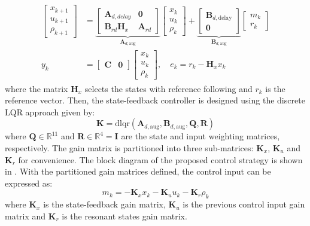 \begin{align}
    \begin{aligned}
        \begin{bmatrix}
            x_{k + 1}\\
            u_{k + 1}\\
            \rho_{k + 1}
        \end{bmatrix}
        &=
        \underbrace{
        \begin{bmatrix}
            \mathbf{A}_{d,delay} & \mathbf{0} \\
            \mathbf{B}_{rd}\mathbf{H}_x & \mathbf{A}_{rd}
        \end{bmatrix}
        }_{\mathbf{A}_{d,\text{aug}}}
        \begin{bmatrix}
            x_k\\
            u_k\\
            \rho_k
        \end{bmatrix}
        +
        \underbrace{
        \begin{bmatrix}
            \mathbf{B}_{d,\text{delay}}\\
            \mathbf{0}
        \end{bmatrix}
        }_{\mathbf{B}_{d,\text{aug}}}
        \begin{bmatrix}
            m_k\\
            r_k
        \end{bmatrix}
        \\
        y_k &= 
        \begin{bmatrix}
            \mathbf{C} & \mathbf{0}
        \end{bmatrix}
        \begin{bmatrix}
            x_k\\
            u_k\\
            \rho_k
        \end{bmatrix}, \quad
        e_k = r_k - \mathbf{H}_x x_k
    \end{aligned}
\end{align}
where the matrix $\mathbf{H}_x$ selects the states with reference following and $r_k$ is the reference vector.
Then, the state-feedback controller is designed using the discrete LQR approach given by:
\begin{equation}
    \mathbf{K} = \text{dlqr}(\mathbf{A}_{d,\text{aug}}, \mathbf{B}_{d,\text{aug}}, \mathbf{Q}, \mathbf{R})
\end{equation}
where $\mathbf{Q}\in\mathbb{R}^{11}$ and $\mathbf{R}\in\mathbb{R}^4 = \mathbf{I}$ are the state and input weighting matrices, respectively. The gain matrix is partitioned into three sub-matrices: $\mathbf{K}_x$, $\mathbf{K}_u$ and $\mathbf{K}_r$ for convenience. The block diagram of the proposed control strategy is shown in . With the partitioned gain matrices defined, the control input can be expressed as:
\begin{equation}
    m_k = -\mathbf{K}_x
    x_k - \mathbf{K}_u u_k - \mathbf{K}_r \rho_k
\end{equation}
where $\mathbf{K}_x$ is the state-feedback gain matrix, $\mathbf{K}_u$ is the previous control input gain matrix and $\mathbf{K}_r$ is the resonant states gain matrix.

